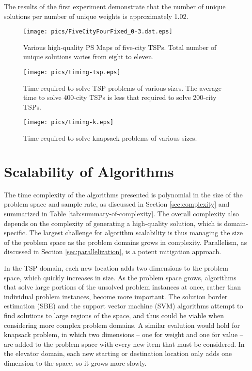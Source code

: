 The results of the first experiment demonstrate that the number of unique solutions per number of unique weights is approximately 1.02.




\begin{figure}
\begin{center}
\texttt{[image: pics/FiveCityFourFixed\_0-3.dat.eps]}
\caption{Various high-quality PS Maps of five-city TSPs.  Total number of unique solutions varies from eight to eleven.}
\label{fig:five_city_tsps}
\end{center}
\end{figure}


\begin{figure}
\begin{center}
\texttt{[image: pics/timing-tsp.eps]}
\caption{Time required to solve TSP problems of various sizes.  The average time to solve 400-city TSPs is less that required to solve 200-city TSPs.}
\label{fig:timing-tsp}
\end{center}
\end{figure}

\begin{figure}
\begin{center}
\texttt{[image: pics/timing-k.eps]}
\caption{Time required to solve knapsack problems of various sizes.}
\label{fig:timing-k}
\end{center}
\end{figure}


\section{Scalability of Algorithms}

The time complexity of the algorithms presented is polynomial in the size of the problem space and sample rate, as discussed in Section \ref{sec:complexity} and summarized in Table \ref{tab:summary-of-complexity}.  The overall complexity also depends on the complexity of generating a high-quality solution, which is domain-specific. The largest challenge for algorithm scalability is thus managing the size of the problem space as the problem domains grows in complexity.  Parallelism, as discussed in Section \ref{sec:parallelization}, is a potent mitigation approach.

In the TSP domain, each new location adds two dimensions to the problem space, which quickly increases in size.  As the problem space grows, algorithms that solve large portions of the unsolved problem instances at once, rather than individual problem instances, become more important.  The solution border estimation (SBE) and the support vector machine (SVM) algorithms attempt to find solutions to large regions of the space, and thus could be viable when considering more complex problem domains.  A similar evalution would hold for knapsack problem, in which two dimensions -- one for weight and one for value -- are added to the problem space with every new item that must be considered.  In the elevator domain, each new starting or destination location only adds one dimension to the space, so it grows more slowly.

